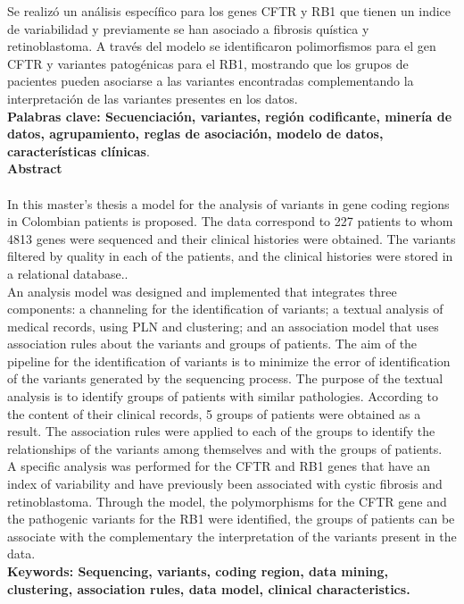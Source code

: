 Se realizó un análisis específico para los genes CFTR y RB1 que tienen un indice de variabilidad y previamente se han asociado a fibrosis quística y retinoblastoma. A través del modelo se identificaron polimorfismos para el gen CFTR y variantes patogénicas para el RB1, mostrando que los grupos de pacientes pueden asociarse  a las variantes encontradas complementando la interpretación de las variantes presentes en los datos.   \\

\textbf{\small Palabras clave: Secuenciación, variantes, región codificante, minería de datos, agrupamiento, reglas de asociación, modelo de datos, características clínicas}.\\


\textbf{\LARGE Abstract}\\\\
In this master's thesis a model for the analysis of variants in gene coding regions in Colombian patients is proposed. The data correspond to 227 patients to whom 4813 genes were sequenced and their clinical histories were obtained. The variants filtered by quality in each of the patients, and the clinical histories were stored in a relational database.. \\

An analysis model was designed and implemented that integrates three components: a channeling for the identification of variants; a textual analysis of medical records, using PLN and clustering; and an association model that uses association rules about the variants and groups of patients. The aim of the pipeline for the identification of variants is to minimize the error of identification of the variants generated by the sequencing process. The purpose of the textual analysis is to identify groups of patients with similar pathologies. According to the content of their clinical records, 5 groups of patients were obtained as a result. The association rules were applied to each of the groups to identify the relationships of the variants among themselves and with the groups of patients. \\

A specific analysis was performed for the CFTR and RB1 genes that have an index of variability and have previously been associated with cystic fibrosis and retinoblastoma. Through the model, the polymorphisms for the CFTR gene and the pathogenic variants for the RB1 were identified, the groups of patients can  be associate with the complementary  the interpretation of the variants present in the data. \\


\textbf{\small Keywords: Sequencing, variants, coding region, data mining, clustering, association rules, data model, clinical characteristics.}\\